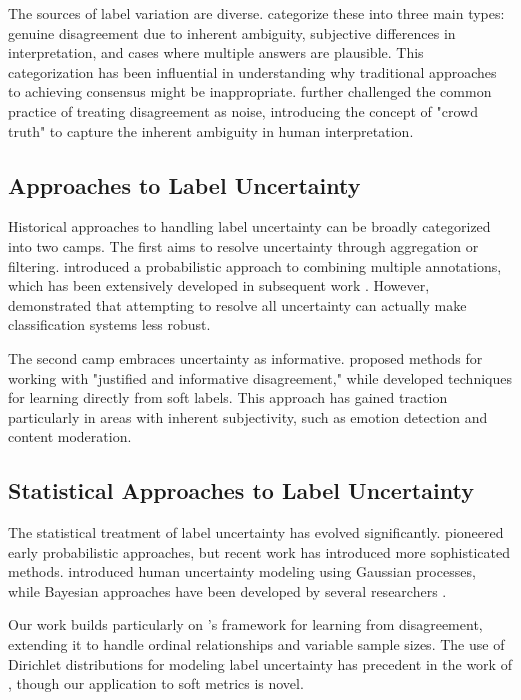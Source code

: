 \documentclass[journal]{IEEEtran}
\begin{document}
The sources of label variation are diverse. \cite{uma2021} categorize these into three main types: genuine disagreement due to inherent ambiguity, subjective differences in interpretation, and cases where multiple answers are plausible. This categorization has been influential in understanding why traditional approaches to achieving consensus might be inappropriate. \cite{aroyo2015} further challenged the common practice of treating disagreement as noise, introducing the concept of "crowd truth" to capture the inherent ambiguity in human interpretation.

\subsection{Approaches to Label Uncertainty}
Historical approaches to handling label uncertainty can be broadly categorized into two camps. The first aims to resolve uncertainty through aggregation or filtering. \cite{dawid1979} introduced a probabilistic approach to combining multiple annotations, which has been extensively developed in subsequent work \cite{paun2022}. However, \cite{peterson2019} demonstrated that attempting to resolve all uncertainty can actually make classification systems less robust.

The second camp embraces uncertainty as informative. \cite{sommerauer2020} proposed methods for working with "justified and informative disagreement," while \cite{fornaciari2021} developed techniques for learning directly from soft labels. This approach has gained traction particularly in areas with inherent subjectivity, such as emotion detection \cite{demszky2020} and content moderation.

\subsection{Statistical Approaches to Label Uncertainty}
The statistical treatment of label uncertainty has evolved significantly. \cite{smyth1995} pioneered early probabilistic approaches, but recent work has introduced more sophisticated methods. \cite{peterson2019} introduced human uncertainty modeling using Gaussian processes, while Bayesian approaches have been developed by several researchers \cite{gordon2021,li2019}.

Our work builds particularly on \cite{uma2021}'s framework for learning from disagreement, extending it to handle ordinal relationships and variable sample sizes. The use of Dirichlet distributions for modeling label uncertainty has precedent in the work of \cite{archambeau2016}, though our application to soft metrics is novel.
\end{document}
